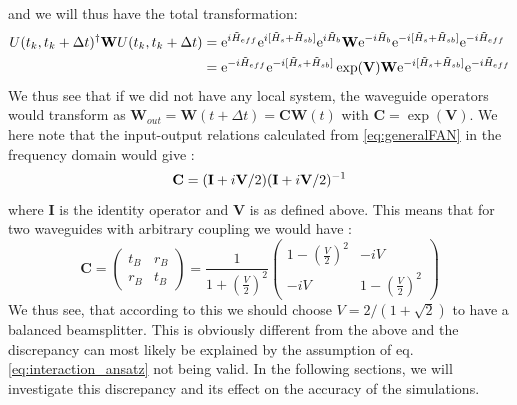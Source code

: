 and we will thus have the total transformation:
\begin{align}
    U(t_k,t_k+\Delta t)^\dagger \textbf{W} U(t_k,t_k+\Delta t) &=  \mathrm{e}^{i \Tilde{H}_{eff}} \mathrm{e}^{ i [ \Tilde{H}_{s} + \Tilde{H}_{sb}]}  \mathrm{e}^{ i \Tilde{H}_b } \textbf{W} \mathrm{e}^{ -i \Tilde{H}_b } \mathrm{e}^{ -i [ \Tilde{H}_{s} + \Tilde{H}_{sb}]} \mathrm{e}^{-i \Tilde{H}_{eff}} \\
    &= \mathrm{e}^{-i \Tilde{H}_{eff}} \mathrm{e}^{ -i [ \Tilde{H}_{s} + \Tilde{H}_{sb}]}  \exp(\textbf{V}) \textbf{W} \mathrm{e}^{ -i [ \Tilde{H}_{s} + \Tilde{H}_{sb}]} \mathrm{e}^{-i \Tilde{H}_{eff}}
\end{align}
We thus see that if we did not have any local system, the waveguide operators would transform as $\textbf{W}_{out} = \textbf{W}(t+\Delta t) = \textbf{C} \textbf{W}(t)$ with $\textbf{C}=\exp(\textbf{V})$. We here note that the input-output relations calculated from \eqref{eq:generalFAN} in the frequency domain would give \cite{Xu2016FanoTransport}:
\begin{equation}
    \textbf{\textbf{C}} = (\textbf{I} + i\textbf{V}/2)(\textbf{I} + i\textbf{V}/2)^{-1}
\end{equation}
where $\textbf{I}$ is the identity operator and $\textbf{V}$ is as defined above. This means that for two waveguides with arbitrary coupling we would have \cite{Joanesarson2020Few-photonGeometries}:
\begin{equation}
\mathbf{C}=\left(\begin{array}{ll}
t_B & r_B \\
r_B & t_B
\end{array}\right)=\frac{1}{1+\left(\frac{V}{2}\right)^2}\left(\begin{array}{cc}
1-\left(\frac{V}{2}\right)^2 & -i V \\
-i V & 1-\left(\frac{V}{2}\right)^2
\end{array}\right)
\end{equation}
We thus see, that according to this we should choose $V =  2/(1+\sqrt{2})$ to have a balanced beamsplitter. This is obviously different from the above and the discrepancy can most likely be explained by the assumption of eq. \eqref{eq:interaction_ansatz} not being valid. In the following sections, we will investigate this discrepancy and its effect on the accuracy of the simulations. 




